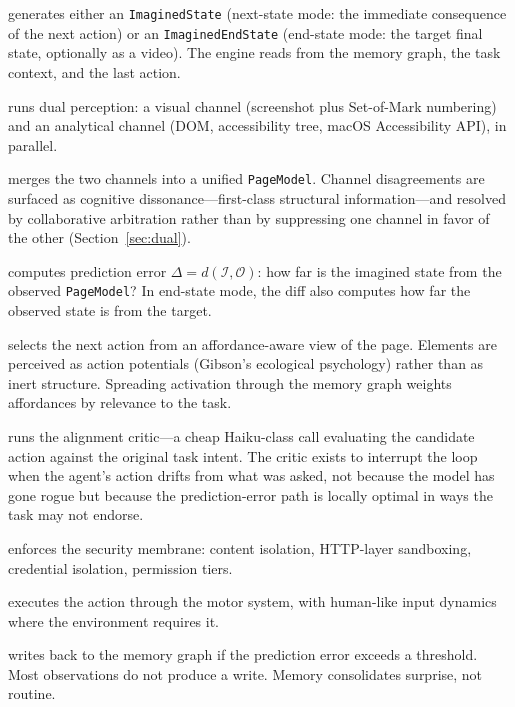 \documentclass[12pt]{article}
\theoremstyle{definition}
\theoremstyle{remark}
\newcommand{\imag}{\mathcal{I}}                  %
\newcommand{\obs}{\mathcal{O}}                   %
\newcommand{\err}{\Delta}                        %
\begin{document}
\begin{description}[leftmargin=*]
\item[\textbf{IMAGINE}] generates either an \texttt{ImaginedState}
  (next-state mode: the immediate consequence of the next action) or an
  \texttt{ImaginedEndState} (end-state mode: the target final state,
  optionally as a video). The engine reads from the memory graph, the
  task context, and the last action.
\item[\textbf{OBSERVE}] runs dual perception: a visual channel
  (screenshot plus Set-of-Mark numbering) and an analytical channel
  (DOM, accessibility tree, macOS Accessibility API), in parallel.
\item[\textbf{RECONCILE}] merges the two channels into a unified
  \texttt{PageModel}. Channel disagreements are surfaced as cognitive
  dissonance---first-class structural information---and resolved by
  collaborative arbitration rather than by suppressing one channel
  in favor of the other (Section~\ref{sec:dual}).
\item[\textbf{DIFF}] computes prediction error
  $\err = d(\imag, \obs)$: how far is the imagined state from the
  observed \texttt{PageModel}? In end-state mode, the diff also
  computes how far the observed state is from the target.
\item[\textbf{PLAN}] selects the next action from an affordance-aware
  view of the page. Elements are perceived as action potentials
  (Gibson's ecological psychology) rather than as inert structure.
  Spreading activation through the memory graph weights affordances
  by relevance to the task.
\item[\textbf{CHECK}] runs the alignment critic---a cheap Haiku-class
  call evaluating the candidate action against the original task
  intent. The critic exists to interrupt the loop when the agent's
  action drifts from what was asked, not because the model has gone
  rogue but because the prediction-error path is locally optimal in
  ways the task may not endorse.
\item[\textbf{GUARD}] enforces the security membrane: content
  isolation, HTTP-layer sandboxing, credential isolation, permission
  tiers.
\item[\textbf{ACT}] executes the action through the motor system, with
  human-like input dynamics where the environment requires it.
\item[\textbf{LEARN}] writes back to the memory graph if the prediction
  error exceeds a threshold. Most observations do not produce a write.
  Memory consolidates surprise, not routine.
\end{description}
\end{document}
